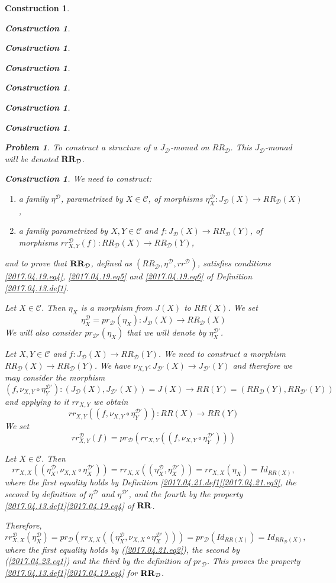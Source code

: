 \documentclass[12pt]{amsart}
\newenvironment{eq}{\begin{equation}}{\end{equation}}
\newtheorem{problem}[proposition]{Problem}
\newtheorem{construction}[proposition]{Construction}
\newcommand{\llabel}[1]{\label{#1}}
\newcommand{\sr}{\rightarrow}
\newcommand{\RR}{{\bf RR}}
\newcommand{\C}{{\mathcal C}}
\newcommand{\D}{{\mathcal D}}
\begin{document}
\begin{construction}
\begin{construction}
\begin{construction}
\begin{construction}
\begin{construction}
\begin{construction}
\begin{construction}
\begin{problem}
To construct a structure of a $J_{\D}$-monad on $RR_{\D}$. This $J_{\D}$-monad will be denoted $\RR_{\D}$.
\end{problem}
%
\begin{construction}\rm
\llabel{2017.04.21.constr1}
We need to construct:
%
\begin{enumerate}
\item a family $\eta^{\D}$, parametrized by $X\in\C$, of morphisms $\eta^{\D}_X:J_{\D}(X)\sr RR_{\D}(X)$,
\item a family parametrized by $X,Y\in\C$ and $f:J_{\D}(X)\sr RR_{\D}(Y)$, of morphisms $rr^{\D}_{X,Y}(f):RR_{\D}(X)\sr RR_{\D}(Y)$,
\end{enumerate}
%
and to prove that $\RR_{\D}$, defined as $(RR_{\D},\eta^{\D},rr^{\D})$,
satisfies conditions \ref{2017.04.19.eq4}, \ref{2017.04.19.eq5} and
\ref{2017.04.19.eq6} of Definition \ref{2017.04.13.def1}.

Let $X\in\C$. Then $\eta_X$ is a morphism from $J(X)$ to $RR(X)$. We set 
%
\begin{eq}
\llabel{2017.04.21.eq1}
\eta^{\D}_X=pr_{\D}(\eta_X):J_{\D}(X)\sr RR_{\D}(X)
\end{eq}%
%
We will also consider $pr_{\D'}(\eta_X)$ that we will denote by $\eta^{\D'}_X$. 

Let $X,Y\in\C$ and $f:J_{\D}(X)\sr RR_{\D}(Y)$. We need to construct a morphism
$RR_{\D}(X)\sr RR_{\D}(Y)$. We have $\nu_{X,Y}:J_{\D'}(X)\sr J_{\D'}(Y)$ and
therefore we may consider the morphism
%
$$(f,\nu_{X,Y}\circ \eta^{\D'}_Y):(J_{\D}(X),J_{\D'}(X))=J(X)\sr RR(Y)=(RR_{\D}(Y),RR_{\D'}(Y))$$
%
and applying to it $rr_{X,Y}$ we obtain 
%
$$rr_{X,Y}((f,\nu_{X,Y}\circ \eta^{\D'}_Y)):RR(X)\sr RR(Y)$$
%
We set
%
\begin{eq}
\llabel{2017.04.21.eq2}
rr^{\D}_{X,Y}(f)=pr_{\D}(rr_{X,Y}((f,\nu_{X,Y}\circ \eta^{\D'}_Y)))
\end{eq}%
%

Let $X\in\C$. Then
%
\begin{eq}
\llabel{2017.04.23.eq1}
rr_{X,X}((\eta^{\D}_X,\nu_{X,X}\circ \eta^{\D'}_X))=
rr_{X,X}((\eta^{\D}_X,\eta^{\D'}_X))=
rr_{X,X}(\eta_X)=
Id_{RR(X)},
\end{eq}%
%
where the first equality holds by Definition
\ref{2017.04.21.def1}\ref{2017.04.21.eq3}, the second by definition of
$\eta^{\D}$ and $\eta^{\D'}$, and the fourth by the property
\ref{2017.04.13.def1}\ref{2017.04.19.eq4} of $\RR$.

Therefore,
%
$$rr^{\D}_{X,X}(\eta^{\D}_X)=
pr_{\D}(rr_{X,X}((\eta^{\D}_X,\nu_{X,X}\circ \eta^{\D'}_X)))=
pr_{\D}(Id_{RR(X)})=Id_{RR_{\D}(X)},$$
%
where the first equality holds by (\ref{2017.04.21.eq2}), the second by
(\ref{2017.04.23.eq1}) and the third by the definition of $pr_{\D}$. This
proves the property \ref{2017.04.13.def1}\ref{2017.04.19.eq4} for $\RR_{\D}$.


\end{construction}
\end{construction}
\end{construction}
\end{construction}
\end{construction}
\end{construction}
\end{construction}
\end{construction}
\end{document}
